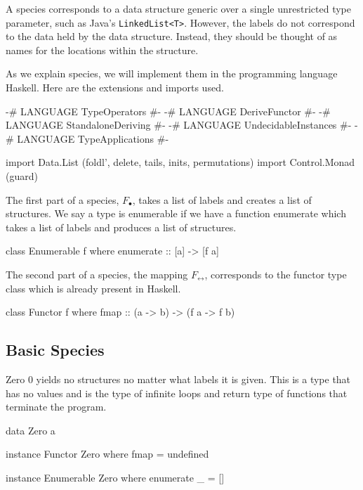 \documentclass{beamer}
\begin{document}
\begin{frame}[fragile]
  A species corresponds to a data structure generic over a single unrestricted type parameter, such
  as Java's \verb|LinkedList<T>|. However, the labels do not correspond to the data held by the data
  structure. Instead, they should be thought of as names for the locations within the structure.
\end{frame}
\begin{frame}[fragile]
  As we explain species, we will implement them in the programming language Haskell. Here are the
  extensions and imports used.
  \begin{code}
{-# LANGUAGE TypeOperators #-}
{-# LANGUAGE DeriveFunctor #-}
{-# LANGUAGE StandaloneDeriving #-}
{-# LANGUAGE UndecidableInstances #-}
{-# LANGUAGE TypeApplications #-}

import Data.List (foldl', delete, tails, inits, permutations)
import Control.Monad (guard)
  \end{code}
\end{frame}
\begin{frame}[fragile]
  The first part of a species, \( F_\bullet \), takes a list of labels and creates a list of
  structures. We say a type is enumerable if we have a function enumerate which takes a list of
  labels and produces a list of structures.
  \vfill
  \begin{code}
class Enumerable f where
  enumerate :: [a] -> [f a]
  \end{code}
  \vfill
  The second part of a species, the mapping \( F_\leftrightarrow \), corresponds to the functor
  type class which is already present in Haskell.
  \vfill
  \begin{code}
class Functor f where
  fmap :: (a -> b) -> (f a -> f b)
  \end{code}
\end{frame}

\subsection{Basic Species}
\begin{frame}[fragile]{Zero}
  \( 0 \) yields no structures no matter what labels it is given.  This is a type that has no values
  and is the type of infinite loops and return type of functions that terminate the program.
  \pause{}
  \vfill
  \begin{code}
data Zero a

instance Functor Zero where
  fmap = undefined

instance Enumerable Zero where
  enumerate _ = []
  \end{code}
\end{frame}
\end{document}
